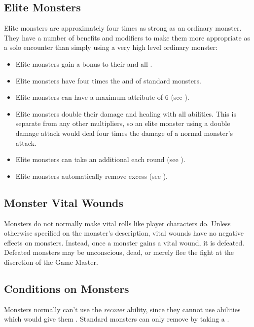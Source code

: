    \subsection{Elite Monsters}\label{Elite Monsters}
        Elite monsters are approximately four times as strong as an ordinary monster.
        They have a number of benefits and modifiers to make them more appropriate as a solo encounter than simply using a very high level ordinary monster:
        \begin{itemize}
            \item Elite monsters gain a  bonus to their  and all .
            \item Elite monsters have four times the  and  of standard monsters.
            \item Elite monsters can have a maximum attribute of 6 (see ).
            \item Elite monsters double their damage and healing with all abilities. This is separate from any other multipliers, so an elite monster using a double damage attack would deal four times the damage of a normal monster's attack.
            \item Elite monsters can take an additional  each round (see ).
            \item Elite monsters automatically remove excess  (see ).
        \end{itemize}

        \subsection{Monster Vital Wounds}
            Monsters do not normally make vital rolls like player characters do.
            Unless otherwise specified on the monster's description, vital wounds have no negative effects on monsters.
            Instead, once a monster gains a vital wound, it is defeated.
            Defeated monsters may be unconscious, dead, or merely flee the fight at the discretion of the Game Master.

        \subsection{Conditions on Monsters}\label{Conditions on Monsters}
            Monsters normally can't use the \textit{recover} ability, since they cannot use abilities which would give them .
            Standard monsters can only remove  by taking a .

